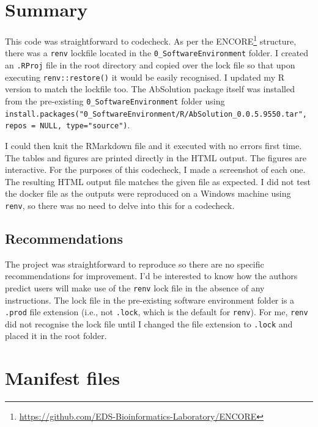 \documentclass[
]{article}
\begin{document}
\section{Summary}\label{summary}

This code was straightforward to codecheck. As per the ENCORE\footnote{\url{https://github.com/EDS-Bioinformatics-Laboratory/ENCORE}}
structure, there was a \texttt{renv} lockfile located in the
\texttt{0\_SoftwareEnvironment} folder. I created an \texttt{.RProj}
file in the root directory and copied over the lock file so that upon
executing \texttt{renv::restore()} it would be easily recognised. I
updated my R version to match the lockfile too. The AbSolution package
itself was installed from the pre-existing
\texttt{0\_SoftwareEnvironment} folder using
\texttt{install.packages("0\_SoftwareEnvironment/R/AbSolution\_0.0.5.9550.tar",\ repos\ =\ NULL,\ type="source")}.

I could then knit the RMarkdown file and it executed with no errors
first time. The tables and figures are printed directly in the HTML
output. The figures are interactive. For the purposes of this codecheck,
I made a screenshot of each one. The resulting HTML output file matches
the given file as expected. I did not test the docker file as the
outputs were reproduced on a Windows machine using \texttt{renv}, so
there was no need to delve into this for a codecheck.

\clearpage

\subsection{Recommendations}\label{recommendations}

The project was straightforward to reproduce so there are no specific
recommendations for improvement. I'd be interested to know how the
authors predict users will make use of the \texttt{renv} lock file in
the absence of any instructions. The lock file in the pre-existing
software environment folder is a \texttt{.prod} file extension (i.e.,
not \texttt{.lock}, which is the default for \texttt{renv}). For me,
\texttt{renv} did not recognise the lock file until I changed the file
extension to \texttt{.lock} and placed it in the root folder.

\clearpage

\section{Manifest files}\label{manifest-files}
\end{document}
